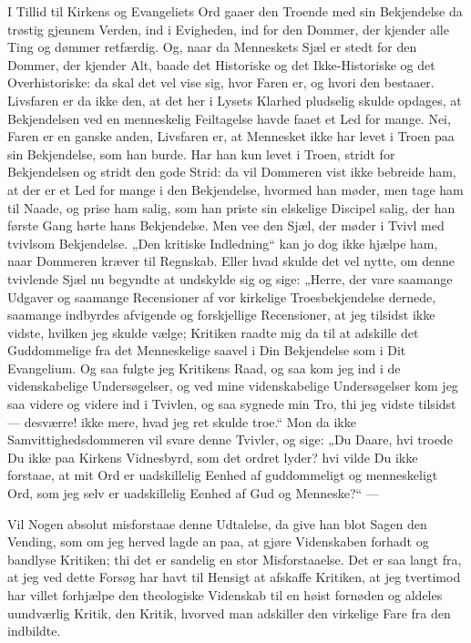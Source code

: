 \documentclass[12pt,a4paper]{book}
\newcommand{\opage}[1]{\marginnote{\footnotesize\textit{[#1]}}}
\begin{document}
I Tillid til Kirkens og Evangeliets Ord gaaer den Troende med sin
Bekjendelse da trøstig gjennem Verden, ind i Evigheden, ind for den
Dommer, der kjender alle Ting og dømmer retfærdig. Og, naar da
Menneskets Sjæl er stedt for den Dommer, der kjender Alt, baade det
Historiske og det Ikke-Historiske og det Overhistoriske: da skal det
vel vise sig, hvor Faren er, og hvori den bestaaer. Livsfaren er da
ikke den, at det her i Lysets Klarhed pludselig skulde opdages, at
Bekjendelsen ved en menneskelig Feiltagelse havde faaet et Led for
mange. Nei, Faren er en ganske anden, Livsfaren er, at Mennesket
ikke har levet i Troen paa sin Bekjendelse, som han burde. Har han
kun levet i Troen, stridt for Bekjendelsen og stridt den gode Strid:
da vil Dommeren vist ikke bebreide ham, at der er et Led for mange i
den Bekjendelse, hvormed han møder, men tage ham til Naade, og prise
ham salig, som han priste sin elskelige Discipel salig, der han
første Gang hørte hans Bekjendelse. Men vee den Sjæl, der møder i
Tvivl med tvivlsom Bekjendelse. „Den kritiske Indledning“ kan jo dog
ikke hjælpe ham, naar Dommeren kræver til Regnskab. Eller hvad skulde
det vel nytte, om denne
\opage{29} tvivlende Sjæl nu begyndte at undskylde sig og sige: „Herre, der vare
saamange Udgaver og saamange Recensioner af vor kirkelige
Troesbekjendelse dernede, saamange indbyrdes afvigende og
forskjellige Recensioner, at jeg tilsidst ikke vidste, hvilken jeg
skulde vælge; Kritiken raadte mig da til at adskille det
Guddommelige fra det Menneskelige saavel i Din Bekjendelse som i Dit
Evangelium. Og saa fulgte jeg Kritikens Raad, og saa kom jeg ind i de
videnskabelige Undersøgelser, og ved mine videnskabelige
Undersøgelser kom jeg saa videre og videre ind i Tvivlen, og saa
sygnede min Tro, thi jeg vidste tilsidst --- desværre! ikke mere,
hvad jeg ret skulde troe.“ Mon da ikke Samvittighedsdommeren vil
svare denne Tvivler, og sige: „Du Daare, hvi troede Du ikke paa
Kirkens Vidnesbyrd, som det ordret lyder? hvi vilde Du ikke forstaae,
at mit Ord er uadskillelig Eenhed af guddommeligt og menneskeligt
Ord, som jeg selv er uadskillelig Eenhed af Gud og Menneske?“ ---

Vil Nogen absolut misforstaae denne Udtalelse, da give han blot Sagen
den Vending, som om jeg herved lagde an paa, at gjøre Videnskaben
forhadt og bandlyse Kritiken; thi det er sandelig en stor
Misforstaaelse. Det er saa langt fra, at jeg ved dette Forsøg har
havt til Hensigt at afskaffe Kritiken, at jeg tvertimod har villet
forhjælpe den theologiske Videnskab til en høist fornøden og aldeles
uundværlig Kritik, den Kritik, hvorved man adskiller den virkelige
Fare fra den indbildte.
\end{document}
